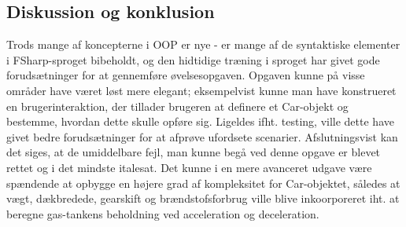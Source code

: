 \documentclass[a4paper,10pt]{article}
\begin{document}
\subsection{Diskussion og konklusion}
Trods mange af koncepterne i OOP er nye - er mange af de syntaktiske elementer i FSharp-sproget bibeholdt, og den hidtidige træning i sproget har givet gode forudsætninger for at gennemføre øvelsesopgaven. \newline
Opgaven kunne på visse områder have været løst mere elegant; eksempelvist kunne man have konstrueret en brugerinteraktion, der tillader brugeren at definere et Car-objekt og bestemme, hvordan dette skulle opføre sig. Ligeldes ifht. testing, ville dette have givet bedre forudsætninger for at afprøve ufordsete scenarier. \newline
Afslutningsvist kan det siges, at de umiddelbare fejl, man kunne begå ved denne opgave er blevet rettet og i det mindste italesat. Det kunne i en mere avanceret udgave være spændende at opbygge en højere grad af kompleksitet for Car-objektet, således at vægt, dækbredede, gearskift og brændstofsforbrug ville blive inkoorporeret iht. at beregne gas-tankens beholdning ved acceleration og deceleration. 
\end{document}
